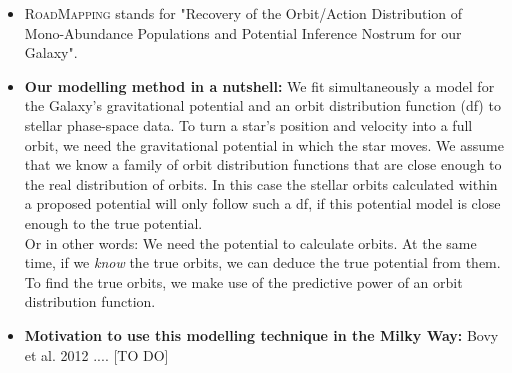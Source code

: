 \documentclass[12pt,preprint]{aastex}
\begin{document}
\begin{itemize}
\item \textsc{RoadMapping} stands for "Recovery of the Orbit/Action Distribution of Mono-Abundance Populations and Potential Inference Nostrum for our Galaxy".
\item \textbf{Our modelling method in a nutshell:} We fit simultaneously a model for the Galaxy's gravitational potential and an orbit distribution function (df) to stellar phase-space data. To turn a star's position and velocity into a full orbit, we need the gravitational potential in which the star moves. We assume that we know a family of orbit distribution functions that are close enough to the real distribution of orbits. In this case the stellar orbits calculated within a proposed potential will only follow such a df, if this potential model is close enough to the true potential.
\\Or in other words: We need the potential to calculate orbits. At the same time, if we \textit{know} the true orbits, we can deduce the true potential from them. To find the true orbits, we make use of the predictive power of an orbit distribution function.

\item \textbf{Motivation to use this modelling technique in the Milky Way:} Bovy et al. 2012 .... [TO DO]


\end{itemize}
\end{document}
